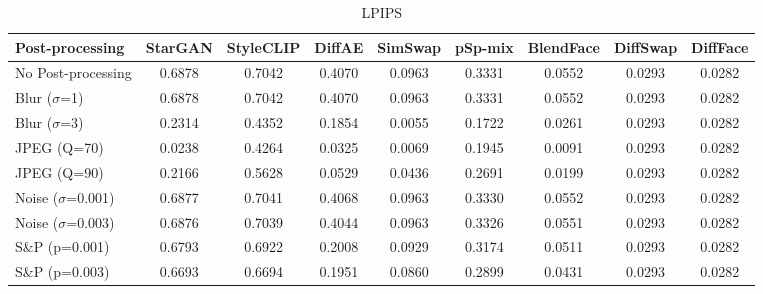 \documentclass{article}
\begin{document}
\begin{table}[h!]
\begin{subtable}{\textwidth}
\caption{LPIPS}
\centering
\scriptsize
\begin{tabular}{lcccccccc}
\toprule
\textbf{Post-processing} & StarGAN & StyleCLIP & DiffAE & SimSwap & pSp-mix & BlendFace & DiffSwap & DiffFace \\
\midrule
No Post-processing & 0.6878 & 0.7042 & 0.4070 & 0.0963 & 0.3331 & 0.0552 & 0.0293 & 0.0282 \\
\midrule
Blur ($\sigma$=1) & 0.6878 & 0.7042 & 0.4070 & 0.0963 & 0.3331 & 0.0552 & 0.0293 & 0.0282 \\
Blur ($\sigma$=3) & 0.2314 & 0.4352 & 0.1854 & 0.0055 & 0.1722 & 0.0261 & 0.0293 & 0.0282 \\
JPEG (Q=70) & 0.0238 & 0.4264 & 0.0325 & 0.0069 & 0.1945 & 0.0091 & 0.0293 & 0.0282 \\
JPEG (Q=90) & 0.2166 & 0.5628 & 0.0529 & 0.0436 & 0.2691 & 0.0199 & 0.0293 & 0.0282 \\
Noise ($\sigma$=0.001) & 0.6877 & 0.7041 & 0.4068 & 0.0963 & 0.3330 & 0.0552 & 0.0293 & 0.0282 \\
Noise ($\sigma$=0.003) & 0.6876 & 0.7039 & 0.4044 & 0.0963 & 0.3326 & 0.0551 & 0.0293 & 0.0282 \\
S\&P (p=0.001) & 0.6793 & 0.6922 & 0.2008 & 0.0929 & 0.3174 & 0.0511 & 0.0293 & 0.0282 \\
S\&P (p=0.003) & 0.6693 & 0.6694 & 0.1951 & 0.0860 & 0.2899 & 0.0431 & 0.0293 & 0.0282 \\
\bottomrule
\end{tabular}
\end{subtable}



\end{table}
\end{document}

